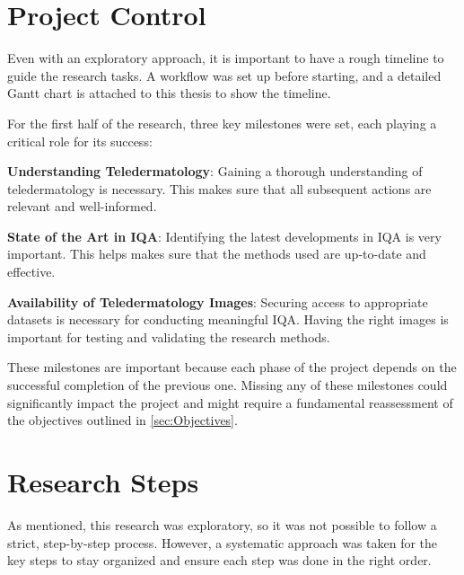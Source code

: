 \section{Project Control}
\label{sec:ProjectMonitoring}
Even with an exploratory approach, it is important to have a rough timeline to guide the research tasks. A workflow was set up before starting, and a detailed Gantt chart is attached to this thesis to show the timeline. \par
\vspace{\baselineskip}
\noindent
For the first half of the research, three key milestones were set, each playing a critical role for its success: \par
\vspace{\baselineskip}
\noindent
\textbf{Understanding Teledermatology}: Gaining a thorough understanding of teledermatology is necessary. This makes sure that all subsequent actions are relevant and well-informed. \par
\vspace{\baselineskip}
\noindent
\textbf{State of the Art in IQA}: Identifying the latest developments in IQA is very important. This helps makes sure that the methods used are up-to-date and effective. \par
\vspace{\baselineskip}
\noindent
\textbf{Availability of Teledermatology Images}: Securing access to appropriate datasets is necessary for conducting meaningful IQA. Having the right images is important for testing and validating the research methods. \par
\vspace{\baselineskip}
\noindent
These milestones are important because each phase of the project depends on the successful completion of the previous one. Missing any of these milestones could significantly impact the project and might require a fundamental reassessment of the objectives outlined in \autoref{sec:Objectives}. \par

\clearpage
\section{Research Steps}
\label{sec:ResearchSteps}
As mentioned, this research was exploratory, so it was not possible to follow a strict, step-by-step process. However, a systematic approach was taken for the key steps to stay organized and ensure each step was done in the right order. \par

